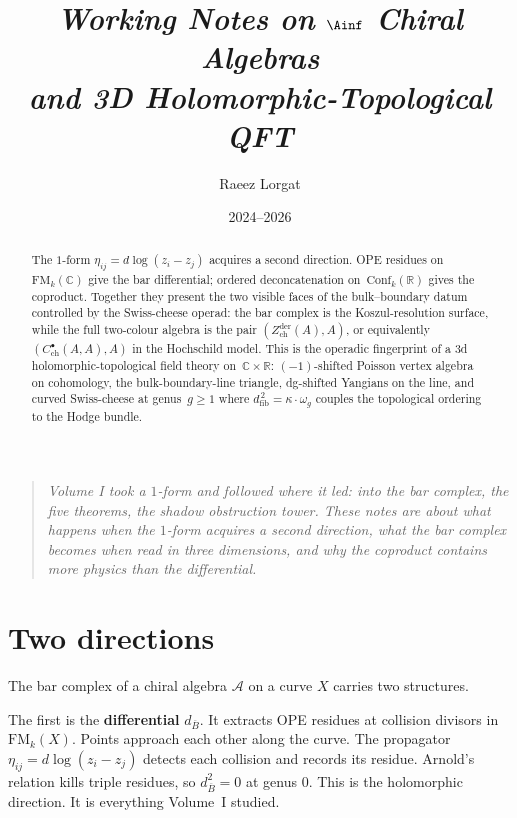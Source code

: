 \documentclass[11pt]{article}
\title{\textit{Working Notes on $\Ainf$ Chiral Algebras\\
and 3D Holomorphic-Topological QFT}}
\author{Raeez Lorgat}
\date{2024--2026}
\newcommand{\cA}{\mathcal{A}}
\newcommand{\barB}{\overline{B}}
\newcommand{\FM}{\mathrm{FM}}
\begin{document}
\maketitle

\begin{abstract}
The $1$-form $\eta_{ij} = d\log(z_i - z_j)$ acquires a second
direction.  OPE residues on~$\mathrm{FM}_k(\mathbb{C})$ give the
bar differential; ordered deconcatenation
on~$\mathrm{Conf}_k(\mathbb{R})$ gives the coproduct.  Together
they present the two visible faces of the bulk--boundary datum
controlled by the Swiss-cheese operad: the bar complex is the
Koszul-resolution surface, while the full two-colour algebra is
the pair $(Z^{\mathrm{der}}_{\mathrm{ch}}(A),A)$, or equivalently
$(C^\bullet_{\mathrm{ch}}(A,A),A)$ in the Hochschild model.  This is
the operadic fingerprint of a $3$d holomorphic-topological field theory
on~$\mathbb{C} \times \mathbb{R}$:
$(-1)$-shifted Poisson vertex algebra on cohomology,
the bulk-boundary-line triangle, dg-shifted Yangians on the line,
and curved Swiss-cheese at genus~$g \ge 1$ where
$d_{\mathrm{fib}}^{\,2} = \kappa \cdot \omega_g$ couples the
topological ordering to the Hodge bundle.
\end{abstract}

\begin{quote}
\itshape
Volume I took a $1$-form and followed where it led: into the
bar complex, the five theorems, the shadow obstruction tower.
These notes are about what happens when the $1$-form acquires
a second direction, what the bar complex becomes when read in
three dimensions, and why the coproduct contains more physics
than the differential.
\end{quote}

\tableofcontents


\section{Two directions}
\label{sec:two-directions}

The bar complex of a chiral algebra $\cA$ on a curve $X$ carries
two structures.

\medskip

The first is the \textbf{differential} $d_{\barB}$.  It extracts
OPE residues at collision divisors in $\FM_k(X)$.  Points
approach each other along the curve.  The propagator
$\eta_{ij} = d\log(z_i - z_j)$ detects each collision and records
its residue.  Arnold's relation kills triple residues, so
$d_{\barB}^2 = 0$ at genus $0$.  This is the holomorphic
direction.  It is everything Volume~I studied.
\end{document}
